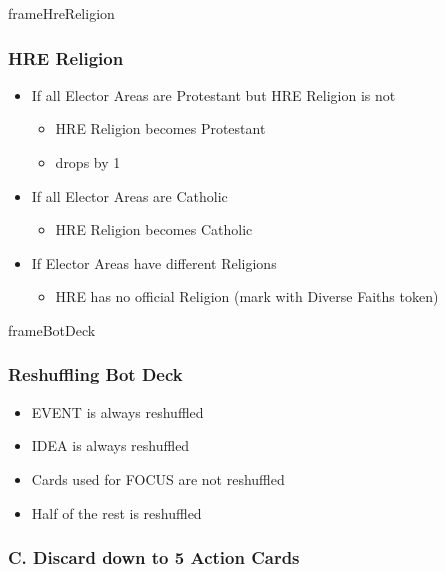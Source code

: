 \documentclass[10pt]{article}
\begin{document}
\begin{dynamiccontents*}{frameHreReligion}
	\subsubsection*{HRE Religion }
	\begin{itemize}
		\item If all Elector Areas are Protestant but HRE Religion is not
		\begin{itemize}
			\item HRE Religion becomes Protestant
			\item \authority drops by 1
		\end{itemize}
		\item If all Elector Areas are Catholic
		\begin{itemize}
			\item HRE Religion becomes Catholic
		\end{itemize}
		\item If Elector Areas have different Religions
		\begin{itemize}
			\item HRE has no official Religion (mark with Diverse Faiths token)
		\end{itemize}
	\end{itemize}
\end{dynamiccontents*}
\begin{dynamiccontents*}{frameBotDeck}
	\botrules
	\subsubsection*{Reshuffling Bot Deck }
	\begin{itemize}
		\item EVENT is always reshuffled
		\item IDEA is always reshuffled
		\item Cards used for FOCUS are not reshuffled
		\item Half of the rest is reshuffled
	\end{itemize}
\end{dynamiccontents*}

\subsubsection*{C. Discard down to 5 Action Cards}
\end{document}
